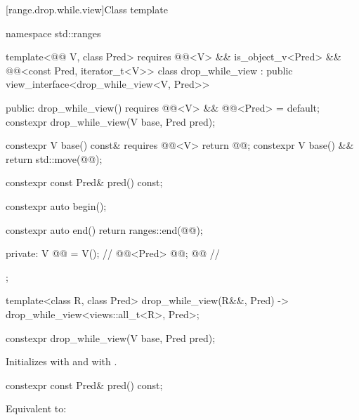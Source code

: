 [range.drop.while.view]{Class template }

%
%
%
\begin{codeblock}
namespace std::ranges {
  template<@@ V, class Pred>
    requires @@<V> && is_object_v<Pred> &&
             @@<const Pred, iterator_t<V>>
  class drop_while_view : public view_interface<drop_while_view<V, Pred>> {
  public:
    drop_while_view() requires @@<V> && @@<Pred> = default;
    constexpr drop_while_view(V base, Pred pred);

    constexpr V base() const& requires @@<V> { return @@; }
    constexpr V base() && { return std::move(@@); }

    constexpr const Pred& pred() const;

    constexpr auto begin();

    constexpr auto end()
    { return ranges::end(@@); }

  private:
    V @@ = V();                                      // \expos
    @@<Pred> @@; @\itcorr[-1]@                          // \expos
  };

  template<class R, class Pred>
    drop_while_view(R&&, Pred) -> drop_while_view<views::all_t<R>, Pred>;
}
\end{codeblock}

%
\begin{itemdecl}
constexpr drop_while_view(V base, Pred pred);
\end{itemdecl}

\begin{itemdescr}
\pnum
\effects
Initializes  with  and
 with .
\end{itemdescr}

%
\begin{itemdecl}
constexpr const Pred& pred() const;
\end{itemdecl}

\begin{itemdescr}
\pnum
\effects
Equivalent to: 
\end{itemdescr}

